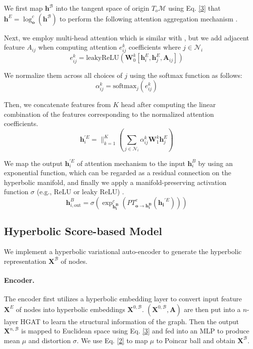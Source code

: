 \documentclass[letterpaper]{article} %
\begin{document}
We first map $\mathbf{h}^\mathcal{B}$ into the tangent space of origin $T_o\mathcal{M}$ using Eq. \eqref{3} that $\mathbf{h}^E=\log _{\boldsymbol{o}}^{c}(\mathbf{h}^\mathcal{B})$ to perform the following attention aggregation mechanism \cite{velivckovic2017graph}.

Next, we employ multi-head attention which is similar with \cite{velivckovic2017graph}, but we add adjacent feature $A_{ij}$ when computing attention $e^k_{i j}$ coefficients where $j\in \mathcal{N}_i$
\begin{equation}
e^{k}_{i j}=\text{leakyReLU}\left(\mathbf{W}^{k}_0 [\mathbf{h}^{E}_{i}, \mathbf{h}^{E}_{j},\mathbf{A}_{ij}]\right)
\end{equation}

We normalize them across all choices of $j$ using the softmax function as follows:
\begin{equation}
\alpha^{k}_{i j}=\mathrm{softmax}_j(e^{k}_{i j})
\end{equation}

Then, we concatenate features from $K$ head after computing the linear combination of the features corresponding to the normalized attention coefficients.
\begin{equation}
\mathbf{h}_{i}^{\prime E}=\mathop{\parallel}_{k=1}^{K}\left(\sum_{j \in \mathcal{N}_{i}} \alpha_{i j}^{k} \mathbf{W}^{k}_1 \mathbf{h}^{E}_{j}\right)
\end{equation}

We map the output $\mathbf{h}_{i}^{\prime E}$ of attention mechanism to the input $\mathbf{h}^B_i$ by using an exponential function, which can be regarded as a residual connection \cite{he2016deep} on the hyperbolic manifold, and finally we apply a manifold-preserving activation function $\sigma$ (e.g., ReLU or leaky ReLU) \cite{liu2019hyperbolic}.
\begin{equation}
\mathbf{h}_{i,\text{out}}^{B}=\sigma(\exp _{\boldsymbol{\mathbf{h}_{i}^B}}^{c}(P T_{\mathbf{o} \rightarrow \mathbf{h_{i}^B}}^{c}(\mathbf{h_{i}}^{\prime E})))
\end{equation}


\subsection{Hyperbolic Score-based Model}
We implement a hyperbolic variational auto-encoder to generate the hyperbolic representation $\boldsymbol{X}^\mathcal{B}$ of nodes.
\paragraph{Encoder.}The encoder first utilizes a hyperbolic embedding layer to convert input feature$\boldsymbol{X}^E$ of nodes into hyperbolic embeddings $\boldsymbol{X}^{0,\mathcal{B}}$. $(\boldsymbol{X}^{0,\mathcal{B}},\boldsymbol{A})$ are then put into a $n$-layer HGAT to learn the structural information of the graph. Then the output $\boldsymbol{X}^{n,\mathcal{B}}$ is mapped to Euclidean space using Eq. \eqref{3} and fed into an MLP to produce mean $\mu$ and distortion $\sigma$.
We use Eq. \eqref{2} to map $\mu$ to Poincar ball and obtain $\boldsymbol{X}^\mathcal{B}$.
\end{document}
